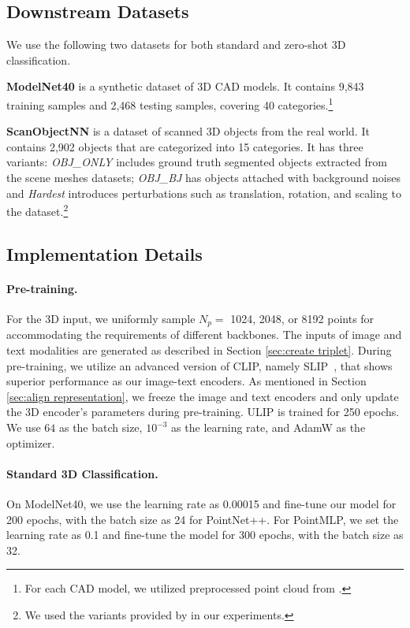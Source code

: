 \documentclass[10pt,twocolumn,letterpaper]{article}
\begin{document}
\subsection{Downstream Datasets}
We use the following two datasets for both standard and zero-shot 3D classification.

\noindent\textbf{ModelNet40} is a synthetic dataset of 3D CAD models. It contains 9,843 training samples and 2,468 testing samples, covering 40 categories.\footnote{For each CAD model, we utilized preprocessed point cloud from \cite{ma2022rethinking}.}

\noindent\textbf{ScanObjectNN} is a dataset of scanned 3D objects from the real world.
It contains 2,902 objects that are categorized into 15 categories. It has three variants: \emph{OBJ\_ONLY} includes ground truth segmented objects extracted from the scene meshes datasets; \emph{OBJ\_BJ} has objects attached with background noises and \emph{Hardest} introduces perturbations such as translation, rotation, and scaling to the dataset\cite{Uy_2019_ICCV}.\footnote{We used the variants provided by \cite{yu2022point} in our experiments.}

\subsection{Implementation Details}

\paragraph{Pre-training.} For the 3D input, we uniformly sample $N_p=$ 1024, 2048, or 8192 points for accommodating the requirements of different backbones. The inputs of image and text modalities are generated as described in Section \ref{sec:create triplet}. During pre-training, we utilize an advanced version of CLIP, namely SLIP~\cite{mu2022slip}, that shows superior performance as our image-text encoders. 
As mentioned in Section \ref{sec:align representation}, we freeze the image and text encoders and only update the 3D encoder's parameters during pre-training. 
ULIP is trained for 250 epochs.
We use $64$ as the batch size, $10^{-3}$ as the learning rate, and AdamW as the optimizer. %

\vspace{-10pt}
\paragraph{Standard 3D Classification.} On ModelNet40, we use the learning rate as 0.00015 and fine-tune our model for 200 epochs, with the batch size as 24 for PointNet++. 
For PointMLP, we set the learning rate as 0.1 and fine-tune the model for 300 epochs, with the batch size as 32. 
\end{document}
